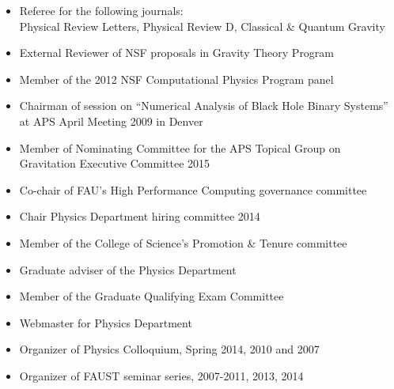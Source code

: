\documentclass[11pt]{article}
\begin{document}
\begin{itemize}
\item	Referee for the following journals:\\
	Physical Review Letters, Physical Review D,
	Classical \& Quantum Gravity
\item	External Reviewer of NSF proposals in Gravity Theory Program
\item	Member of the 2012 NSF Computational Physics Program panel
\item	Chairman of session on
	``Numerical Analysis of Black Hole Binary Systems''
	at APS April Meeting 2009 in Denver
\item	Member of Nominating Committee for the APS Topical Group on
	Gravitation Executive Committee 2015
\item	Co-chair of FAU's High Performance Computing  
	governance committee 
\item	Chair Physics Department hiring committee 2014
\item   Member of the College of Science's Promotion \& Tenure committee
\item	Graduate adviser of the Physics Department
\item	Member of the Graduate Qualifying Exam Committee
\item	Webmaster for Physics Department
\item	Organizer of Physics Colloquium, Spring 2014, 2010 and 2007
\item	Organizer of FAUST seminar series, 2007-2011, 2013, 2014
\end{itemize}



% 
\end{document}
